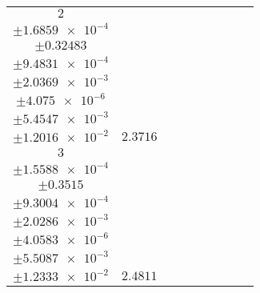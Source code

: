 \documentclass[8pt]{article}
\begin{document}
\begin{longtable}[l]{c c c c c c c c c}
$\num{2}$ & \begin{tabular}[c]{@{}c@{}}$\num{3.0096e-2}$ \\ $\pm\num{1.6859e-4}$\end{tabular} & \begin{tabular}[c]{@{}c@{}}$\num{-3.3183e-2}$ \\ $\pm\num{0.32483}$\end{tabular} & \begin{tabular}[c]{@{}c@{}}$\num{-7.4049}$ \\ $\pm\num{9.4831e-4}$\end{tabular} & \begin{tabular}[c]{@{}c@{}}$\num{723.17}$ \\ $\pm\num{2.0369e-3}$\end{tabular} & \begin{tabular}[c]{@{}c@{}}$\num{1.4467}$ \\ $\pm\num{4.075e-6}$\end{tabular} & \begin{tabular}[c]{@{}c@{}}$\num{1.1819}$ \\ $\pm\num{5.4547e-3}$\end{tabular} & \begin{tabular}[c]{@{}c@{}}$\num{4.1161}$ \\ $\pm\num{1.2016e-2}$\end{tabular} & $\num{2.3716}$\\
$\num{3}$ & \begin{tabular}[c]{@{}c@{}}$\num{2.8998e-2}$ \\ $\pm\num{1.5588e-4}$\end{tabular} & \begin{tabular}[c]{@{}c@{}}$\num{-0.49504}$ \\ $\pm\num{0.3515}$\end{tabular} & \begin{tabular}[c]{@{}c@{}}$\num{-6.946}$ \\ $\pm\num{9.3004e-4}$\end{tabular} & \begin{tabular}[c]{@{}c@{}}$\num{723.64}$ \\ $\pm\num{2.0286e-3}$\end{tabular} & \begin{tabular}[c]{@{}c@{}}$\num{1.4477}$ \\ $\pm\num{4.0583e-6}$\end{tabular} & \begin{tabular}[c]{@{}c@{}}$\num{1.143}$ \\ $\pm\num{5.5087e-3}$\end{tabular} & \begin{tabular}[c]{@{}c@{}}$\num{4.0938}$ \\ $\pm\num{1.2333e-2}$\end{tabular} & $\num{2.4811}$\\

\end{longtable}
\end{document}
